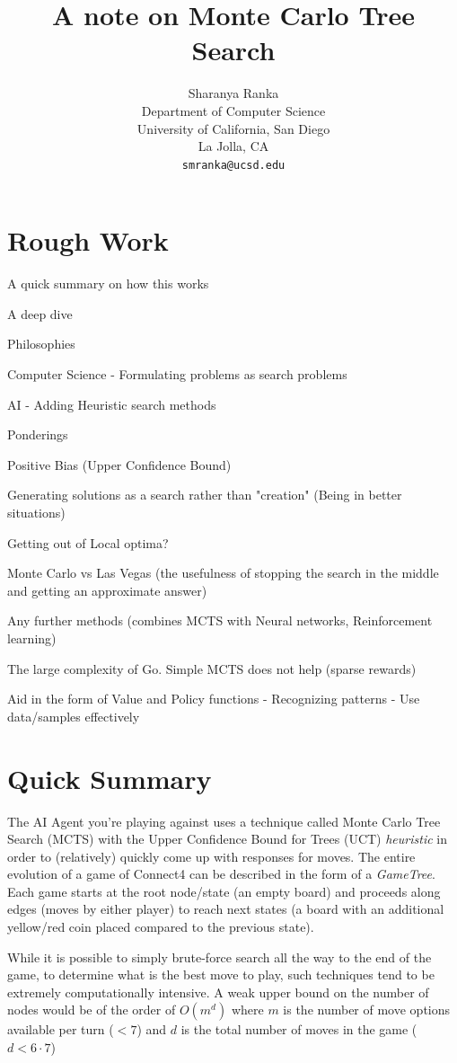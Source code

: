 \documentclass[12pt]{article}
\title{A note on Monte Carlo Tree Search}
\author{%
  Sharanya Ranka \\
  Department of Computer Science\\
  University of California, San Diego\\
  La Jolla, CA \\
  \texttt{smranka@ucsd.edu} \\
}
\begin{document}
\maketitle

\section{Rough Work}
A quick summary on how this works

A deep dive

Philosophies

Computer Science - Formulating problems as search problems

AI - Adding Heuristic search methods

Ponderings

Positive Bias (Upper Confidence Bound)

Generating solutions as a search rather than "creation" (Being in better situations)

Getting out of Local optima?

Monte Carlo vs Las Vegas (the usefulness of stopping the search in the middle and getting an approximate answer)

Any further methods (combines MCTS with Neural networks, Reinforcement learning)

The large complexity of Go. Simple MCTS does not help (sparse rewards)

Aid in the form of Value and Policy functions - Recognizing patterns - Use data/samples effectively

\section{Quick Summary}
The AI Agent you're playing against uses a technique called Monte Carlo Tree Search (MCTS) with the Upper Confidence Bound for Trees (UCT)
\emph{heuristic} in order to (relatively) quickly come up with responses for moves. The entire evolution of a 
game of Connect4 can be described in the form of a \emph{GameTree}. Each game starts at the root node/state (an empty board)
and proceeds along edges (moves by either player) to reach next states (a board with an additional yellow/red coin placed compared
to the previous state).

While it is possible to simply brute-force search all the way to the end of the game, to determine what is the best move to play, such
techniques tend to be extremely computationally intensive. A weak upper bound on the number of nodes would be of the order of $O(m^d)$ where
$m$ is the number of move options available per turn ($<7$) and $d$ is the total number of moves in the game ($d < 6 \cdot 7 $)
\end{document}
